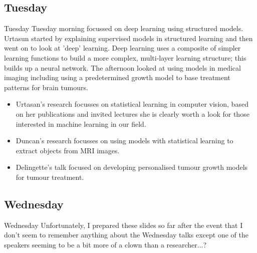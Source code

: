 \documentclass[11pt]{beamer}
\begin{document}
\subsection{Tuesday}
\begin{frame}{Tuesday}
	Tuesday morning focussed on deep learning using structured models. Urtasun started by explaining supervised models in structured learning and then went on to look at 'deep' learning.
	Deep learning uses a composite of simpler learning functions to build a more complex, multi-layer learning structure; this builds up a neural network.
	The afternoon looked at using models in medical imaging including using a predetermined growth model to base treatment patterns for brain tumours.
\end{frame}
\begin{frame} 
  \begin{itemize}
  \item Urtasan's research focusses on statistical learning in computer vision, based on her publications and invited lectures she is clearly worth a look for those interested in machine learning in our field.
  \item Duncan's research focusses on using models with statistical learning to extract objects from MRI images.
  \item Delingette's talk focused on developing personalised tumour growth models for tumour treatment.
  \end{itemize}
\end{frame}

\subsection{Wednesday}
\begin{frame}{Wednesday}
	Unfortunately, I  prepared these slides so far after the event that I don't seem to remember anything about the Wednesday talks except one of the speakers seeming to be a bit more of a clown than a researcher...?
\end{frame}
\end{document}
